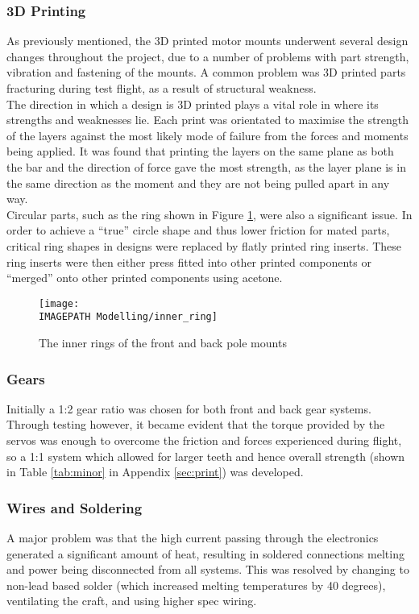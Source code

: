 \subsubsection*{3D Printing}
As previously mentioned, the 3D printed motor mounts underwent several design changes throughout the project, due to a number of problems with part strength, vibration and fastening of the mounts. A common problem was 3D printed parts fracturing during test flight, as a result of structural weakness.\\

The direction in which a design is 3D printed plays a vital role in where its strengths and weaknesses lie. Each print was orientated to maximise the strength of the layers against the most likely mode of failure from the forces and moments being applied. It was found that printing the layers on the same plane as both the bar and the direction of force gave the most strength, as the layer plane is in the same direction as the moment and they are not being pulled apart in any way.\\

Circular parts, such as the ring shown in Figure \ref{fig:innerring}, were also a significant issue. In order to achieve a ``true'' circle shape and thus lower friction for mated parts, critical ring shapes in designs were replaced by flatly printed ring inserts. These ring inserts were then either press fitted into other printed components or ``merged'' onto other printed components using acetone. 

\begin{figure}[!ht]
	\centering
	\texttt{[image: \\IMAGEPATH Modelling/inner\_ring]}
	\caption{The inner rings of the front and back pole mounts}
	\label{fig:innerring}
\end{figure}

\subsubsection*{Gears}
Initially a 1:2 gear ratio was chosen for both front and back gear systems. Through testing however, it became evident that the torque provided by the servos was enough to overcome the friction and forces experienced during flight, so a 1:1 system which allowed for larger teeth and hence overall strength (shown in Table \ref{tab:minor} in Appendix \ref{sec:print}) was developed.

\subsubsection*{Wires and Soldering}
A major problem was that the high current passing through the electronics generated a significant amount of heat, resulting in soldered connections melting and power being disconnected from all systems. This was resolved by changing to non-lead based solder (which increased melting temperatures by 40 degrees), ventilating the craft, and using higher spec wiring. 

